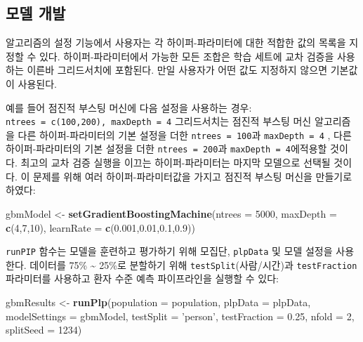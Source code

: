 \documentclass[10.5pt]{book}
\newenvironment{Shaded}{\begin{snugshade}}{\end{snugshade}}
\newcommand{\KeywordTok}[1]{\textcolor[rgb]{0.13,0.29,0.53}{\textbf{#1}}}
\newcommand{\DataTypeTok}[1]{\textcolor[rgb]{0.13,0.29,0.53}{#1}}
\newcommand{\DecValTok}[1]{\textcolor[rgb]{0.00,0.00,0.81}{#1}}
\newcommand{\FloatTok}[1]{\textcolor[rgb]{0.00,0.00,0.81}{#1}}
\newcommand{\StringTok}[1]{\textcolor[rgb]{0.31,0.60,0.02}{#1}}
\newcommand{\NormalTok}[1]{#1}
\theoremstyle{definition}
\theoremstyle{definition}
\theoremstyle{definition}
\theoremstyle{remark}
\begin{document}
\subsection{모델 개발}\label{-}

알고리즘의 설정 기능에서 사용자는 각 하이퍼-파라미터에 대한 적합한 값의
목록을 지정할 수 있다. 하이퍼-파라미터에서 가능한 모든 조합은 학습
세트에 교차 검증을 사용하는 이른바 그리드서치에 포함된다. 만일 사용자가
어떤 값도 지정하지 않으면 기본값이 사용된다.

예를 들어 점진적 부스팅 머신에 다음 설정을 사용하는 경우:
\texttt{ntrees\ =\ c(100,200),\ maxDepth\ =\ 4} 그리드서치는 점진적
부스팅 머신 알고리즘을 다른 하이퍼-파라미터의 기본 설정을 더한
\texttt{ntrees\ =\ 100}과 \texttt{maxDepth\ =\ 4} , 다른
하이퍼-파라미터의 기본 설정을 더한 \texttt{ntrees\ =\ 200}과
\texttt{maxDepth\ =\ 4}에적용할 것이다. 최고의 교차 검증 실행을 이끄는
하이퍼-파라미터는 마지막 모델으로 선택될 것이다. 이 문제를 위해 여러
하이퍼-파라미터값을 가지고 점진적 부스팅 머신을 만들기로 하였다:

\begin{Shaded}
\begin{Highlighting}[]
\NormalTok{gbmModel <-}\StringTok{ }\KeywordTok{setGradientBoostingMachine}\NormalTok{(}\DataTypeTok{ntrees =} \DecValTok{5000}\NormalTok{, }
                                       \DataTypeTok{maxDepth =} \KeywordTok{c}\NormalTok{(}\DecValTok{4}\NormalTok{,}\DecValTok{7}\NormalTok{,}\DecValTok{10}\NormalTok{), }
                                       \DataTypeTok{learnRate =} \KeywordTok{c}\NormalTok{(}\FloatTok{0.001}\NormalTok{,}\FloatTok{0.01}\NormalTok{,}\FloatTok{0.1}\NormalTok{,}\FloatTok{0.9}\NormalTok{))}
\end{Highlighting}
\end{Shaded}

\texttt{runPIP} 함수는 모델을 훈련하고 평가하기 위해 모집단,
\texttt{plpData} 및 모델 설정을 사용한다. 데이터를 75\%
\textasciitilde{} 25\%로 분할하기 위해 \texttt{testSplit}(사람/시간)과
\texttt{testFraction} 파라미터를 사용하고 환자 수준 예측 파이프라인을
실행할 수 있다:

\begin{Shaded}
\begin{Highlighting}[]
\NormalTok{gbmResults <-}\StringTok{ }\KeywordTok{runPlp}\NormalTok{(}\DataTypeTok{population =}\NormalTok{ population, }
                     \DataTypeTok{plpData =}\NormalTok{ plpData, }
                     \DataTypeTok{modelSettings =}\NormalTok{ gbmModel, }
                     \DataTypeTok{testSplit =} \StringTok{'person'}\NormalTok{,}
                     \DataTypeTok{testFraction =} \FloatTok{0.25}\NormalTok{, }
                     \DataTypeTok{nfold =} \DecValTok{2}\NormalTok{, }
                     \DataTypeTok{splitSeed =} \DecValTok{1234}\NormalTok{)}
\end{Highlighting}
\end{Shaded}
\end{document}
